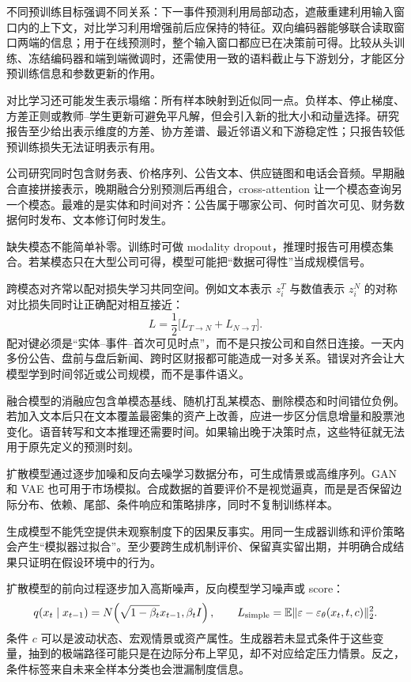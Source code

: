 不同预训练目标强调不同关系：下一事件预测利用局部动态，遮蔽重建利用输入窗口内的上下文，对比学习利用增强前后应保持的特征。双向编码器能够联合读取窗口两端的信息；用于在线预测时，整个输入窗口都应已在决策前可得。比较从头训练、冻结编码器和端到端微调时，还需使用一致的语料截止与下游划分，才能区分预训练信息和参数更新的作用。

对比学习还可能发生表示塌缩：所有样本映射到近似同一点。负样本、停止梯度、方差正则或教师--学生更新可避免平凡解，但会引入新的批大小和动量选择。研究报告至少给出表示维度的方差、协方差谱、最近邻语义和下游稳定性；只报告较低预训练损失无法证明表示有用。


公司研究同时包含财务表、价格序列、公告文本、供应链图和电话会音频。早期融合直接拼接表示，晚期融合分别预测后再组合，cross-attention 让一个模态查询另一个模态。最难的是实体和时间对齐：公告属于哪家公司、何时首次可见、财务数据何时发布、文本修订何时发生。

缺失模态不能简单补零。训练时可做 modality dropout，推理时报告可用模态集合。若某模态只在大型公司可得，模型可能把“数据可得性”当成规模信号。

跨模态对齐常以配对损失学习共同空间。例如文本表示 $z_i^T$ 与数值表示 $z_i^N$ 的对称对比损失同时让正确配对相互接近：
\[
L=\frac12\bigl[L_{T\to N}+L_{N\to T}\bigr].
\]
配对键必须是“实体--事件--首次可见时点”，而不是只按公司和自然日连接。一天内多份公告、盘前与盘后新闻、跨时区财报都可能造成一对多关系。错误对齐会让大模型学到时间邻近或公司规模，而不是事件语义。

融合模型的消融应包含单模态基线、随机打乱某模态、删除模态和时间错位负例。若加入文本后只在文本覆盖最密集的资产上改善，应进一步区分信息增量和股票池变化。语音转写和文本推理还需要时间。如果输出晚于决策时点，这些特征就无法用于原先定义的预测时刻。


扩散模型通过逐步加噪和反向去噪学习数据分布，可生成情景或高维序列。GAN 和 VAE 也可用于市场模拟。合成数据的首要评价不是视觉逼真，而是是否保留边际分布、依赖、尾部、条件响应和策略排序，同时不复制训练样本。

生成模型不能凭空提供未观察制度下的因果反事实。用同一生成器训练和评价策略会产生“模拟器过拟合”。至少要跨生成机制评价、保留真实留出期，并明确合成结果只证明在假设环境中的行为。

扩散模型的前向过程逐步加入高斯噪声，反向模型学习噪声或 score：
\[
q(x_t\mid x_{t-1})=
N\!\left(\sqrt{1-\beta_t}x_{t-1},\beta_tI\right),
\qquad
L_{\rm simple}=\mathbb E\|\varepsilon-
\varepsilon_\theta(x_t,t,c)\|_2^2.
\]
条件 $c$ 可以是波动状态、宏观情景或资产属性。生成器若未显式条件于这些变量，抽到的极端路径可能只是在边际分布上罕见，却不对应给定压力情景。反之，条件标签来自未来全样本分类也会泄漏制度信息。

